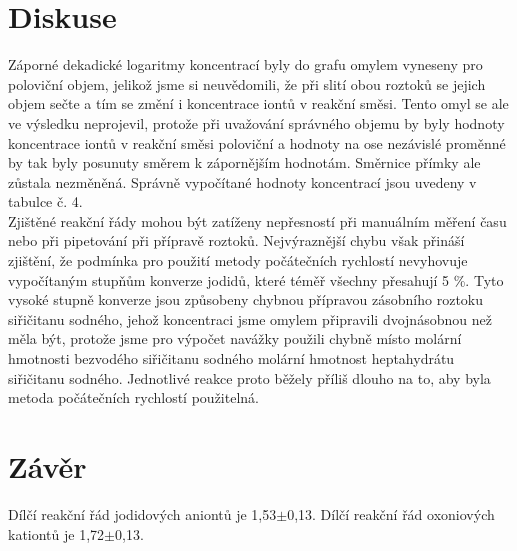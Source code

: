 \documentclass[12pt,a4paper]{article}
\def\jd#1{\ifmmode\,\mathrm{#1}\else\,\textrm{#1}\fi}
\begin{document}
\section*{Diskuse}
Záporné dekadické logaritmy koncentrací byly do grafu omylem vyneseny pro poloviční objem, jelikož jsme si neuvědomili, že při slití obou roztoků se jejich objem sečte a tím se změní i koncentrace iontů v reakční směsi. Tento omyl se ale ve výsledku neprojevil, protože při uvažování správného objemu by byly hodnoty koncentrace iontů v reakční směsi poloviční a hodnoty na ose nezávislé proměnné by tak byly posunuty směrem k zápornějším hodnotám. Směrnice přímky ale zůstala nezměněná. Správně vypočítané hodnoty koncentrací jsou uvedeny v tabulce č. 4.\\
Zjištěné reakční řády mohou být zatíženy nepřesností při manuálním měření času nebo při pipetování při přípravě roztoků. Nejvýraznější chybu však přináší zjištění, že podmínka pro použití metody počátečních rychlostí nevyhovuje vypočítaným stupňům konverze jodidů, které téměř všechny přesahují 5\jd{\%}. Tyto vysoké stupně konverze jsou způsobeny chybnou přípravou zásobního roztoku siřičitanu sodného, jehož koncentraci jsme omylem připravili dvojnásobnou než měla být, protože jsme pro výpočet navážky použili chybně místo molární hmotnosti bezvodého siřičitanu sodného molární hmotnost heptahydrátu siřičitanu sodného. Jednotlivé reakce proto běžely příliš dlouho na to, aby byla metoda počátečních rychlostí použitelná.
\section*{Závěr}
Dílčí reakční řád jodidových aniontů je 1,53$\pm$0,13. Dílčí reakční řád oxoniových kationtů je 1,72$\pm$0,13.
\end{document}
